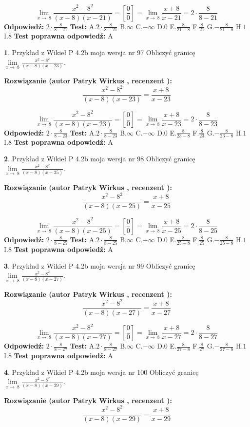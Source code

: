 \documentclass[12pt, a4paper]{article}
\theoremstyle{definition} %
\newtheorem{zad}{}
\newcommand{\zadStart}[1]{\begin{zad}#1\newline}
\newcommand{\zadStop}{\end{zad}}
\newcommand{\rozwStart}[2]{\noindent \textbf{Rozwiązanie (autor #1 , recenzent #2): }\newline}
\newcommand{\rozwStop}{\newline}
\newcommand{\odpStart}{\noindent \textbf{Odpowiedź:}\newline}
\newcommand{\odpStop}{\newline}
\newcommand{\testStart}{\noindent \textbf{Test:}\newline}
\newcommand{\testStop}{\newline}
\newcommand{\kluczStart}{\noindent \textbf{Test poprawna odpowiedź:}\newline}
\newcommand{\kluczStop}{\newline}
\begin{document}
$$\lim\limits_{x\to\ 8}\frac{x^{2}-8^{2}}{(x-8)(x-21)}=[\frac{0}{0}]=\lim\limits_{x\to\ 8}\frac{x+8}{x-21}=2 \cdot \frac{8}{8-21}$$
\rozwStop
\odpStart
$2 \cdot \frac{8}{8-21}$
\odpStop
\testStart
A.$2 \cdot \frac{8}{8-21}$
B.$\infty$
C.$-\infty$
D.$0$
E.$\frac{8}{21-8}$
F.$\frac{8}{21}$
G.$-\frac{8}{21-8}$
H.$1$
I.$8$
\testStop
\kluczStart
A
\kluczStop



\zadStart{Przykład z Wikieł P 4.2b moja wersja nr 97}
Obliczyć granicę $\lim\limits_{x\to\ 8}\frac{x^{2}-8^{2}}{(x-8)(x-23)}$.
\zadStop
\rozwStart{Patryk Wirkus}{}
$$\frac{x^{2}-8^{2}}{(x-8)(x-23)}=\frac{x+8}{x-23}$$

$$\lim\limits_{x\to\ 8}\frac{x^{2}-8^{2}}{(x-8)(x-23)}=[\frac{0}{0}]=\lim\limits_{x\to\ 8}\frac{x+8}{x-23}=2 \cdot \frac{8}{8-23}$$
\rozwStop
\odpStart
$2 \cdot \frac{8}{8-23}$
\odpStop
\testStart
A.$2 \cdot \frac{8}{8-23}$
B.$\infty$
C.$-\infty$
D.$0$
E.$\frac{8}{23-8}$
F.$\frac{8}{23}$
G.$-\frac{8}{23-8}$
H.$1$
I.$8$
\testStop
\kluczStart
A
\kluczStop



\zadStart{Przykład z Wikieł P 4.2b moja wersja nr 98}
Obliczyć granicę $\lim\limits_{x\to\ 8}\frac{x^{2}-8^{2}}{(x-8)(x-25)}$.
\zadStop
\rozwStart{Patryk Wirkus}{}
$$\frac{x^{2}-8^{2}}{(x-8)(x-25)}=\frac{x+8}{x-25}$$

$$\lim\limits_{x\to\ 8}\frac{x^{2}-8^{2}}{(x-8)(x-25)}=[\frac{0}{0}]=\lim\limits_{x\to\ 8}\frac{x+8}{x-25}=2 \cdot \frac{8}{8-25}$$
\rozwStop
\odpStart
$2 \cdot \frac{8}{8-25}$
\odpStop
\testStart
A.$2 \cdot \frac{8}{8-25}$
B.$\infty$
C.$-\infty$
D.$0$
E.$\frac{8}{25-8}$
F.$\frac{8}{25}$
G.$-\frac{8}{25-8}$
H.$1$
I.$8$
\testStop
\kluczStart
A
\kluczStop



\zadStart{Przykład z Wikieł P 4.2b moja wersja nr 99}
Obliczyć granicę $\lim\limits_{x\to\ 8}\frac{x^{2}-8^{2}}{(x-8)(x-27)}$.
\zadStop
\rozwStart{Patryk Wirkus}{}
$$\frac{x^{2}-8^{2}}{(x-8)(x-27)}=\frac{x+8}{x-27}$$

$$\lim\limits_{x\to\ 8}\frac{x^{2}-8^{2}}{(x-8)(x-27)}=[\frac{0}{0}]=\lim\limits_{x\to\ 8}\frac{x+8}{x-27}=2 \cdot \frac{8}{8-27}$$
\rozwStop
\odpStart
$2 \cdot \frac{8}{8-27}$
\odpStop
\testStart
A.$2 \cdot \frac{8}{8-27}$
B.$\infty$
C.$-\infty$
D.$0$
E.$\frac{8}{27-8}$
F.$\frac{8}{27}$
G.$-\frac{8}{27-8}$
H.$1$
I.$8$
\testStop
\kluczStart
A
\kluczStop



\zadStart{Przykład z Wikieł P 4.2b moja wersja nr 100}
Obliczyć granicę $\lim\limits_{x\to\ 8}\frac{x^{2}-8^{2}}{(x-8)(x-29)}$.
\zadStop
\rozwStart{Patryk Wirkus}{}
$$\frac{x^{2}-8^{2}}{(x-8)(x-29)}=\frac{x+8}{x-29}$$
\end{document}
